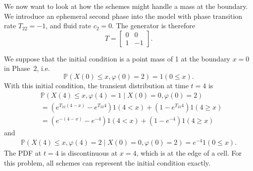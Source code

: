 \begin{example}\label{ex: wave 1}
	We now want to look at how the schemes might handle a mass at the boundary. We introduce an ephemeral second phase into the model with phase transition rate \(T_{22}=-1\), and fluid rate \(c_2=0\). The generator is therefore 
	\[T=\left[\begin{array}{cc} 0 & 0 \\ 1 & -1 \end{array}\right].\]

	We suppose that the initial condition is a point mass of 1 at the boundary \(x=0\) in Phase~\(2\), i.e. \[\mathbb P(X(0)\leq x, \varphi(0)=2)=1(0\leq x).\] 
	With this initial condition, the transient distribution at time \(t=4\) is 
	\begin{align}
		&\mathbb P(X(4)\leq x,\varphi(4)=1 \mid X(0)=0,\varphi(0)=2) \nonumber 
		\\&= \left(e^{T_{22}(4-x)}-e^{T_{22}4}\right)1(4< x) + (1-e^{T_{22}4})1(4\geq x) \nonumber
		\\&= \left(e^{-(4-x)}-e^{-4}\right)1(4< x) + (1-e^{-4})1(4\geq x) \label{eqn: asjda} 
	\end{align}
	and 
	\begin{align}
		\mathbb P(X(4)\leq x,\varphi(4)=2 \mid X(0)=0,\varphi(0)=2) = e^{-4}1(0\leq x).
	\end{align}
	The PDF at \(t=4\) is discontinuous at \(x=4\), which is at the edge of a cell. For this problem, all schemes can represent the initial condition exactly.


\end{example}
